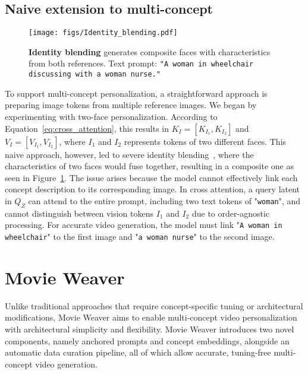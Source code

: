 \subsection{Naive extension to multi-concept}


\begin{figure}[t]
    \begin{center}
    \texttt{[image: figs/Identity\_blending.pdf]}
    \end{center}
    \vspace{-2em}
        \caption{\textbf{Identity blending} generates composite faces with characteristics from both references. Text prompt: \texttt{"A woman in wheelchair discussing with a woman nurse."}}
        \vspace{-1em}
    \label{fig:identity_blending}
\end{figure}


To support multi-concept personalization, a straightforward approach is preparing image tokens from multiple reference images. 
We began by experimenting with two-face personalization. 
According to Equation~\ref{eq:cross_attention}, this results in $ K_I = \left[ K_{I_1}, K_{I_2} \right]$ and $ V_I = \left[ V_{I_1}, V_{I_2} \right]$, where $I_1$ and $I_2$ represents tokens of two different faces.
This naive approach, however, led to severe identity blending~\cite{kumari2023multi,xiao2024fastcomposer}, where the characteristics of two faces would fuse together, resulting in a composite one as seen in Figure~\ref{fig:identity_blending}. 
The issue arises because the model cannot effectively link each concept description to its corresponding image. 
In cross attention, a query latent in $Q_Z$ can attend to the entire prompt, including two text tokens of "\texttt{woman}", and cannot distinguish between vision tokens $I_1$ and $I_2$ due to order-agnostic processing. 
For accurate video generation, the model must link "\texttt{A woman in wheelchair}" to the first image and "\texttt{a woman nurse}" to the second image.


\section{Movie Weaver}
\label{sec:method}

Unlike traditional approaches that require concept-specific tuning or architectural modifications, Movie Weaver aims to enable multi-concept video personalization with architectural simplicity and flexibility. 
Movie Weaver introduces two novel components, namely anchored prompts and concept embeddings, alongside an automatic data curation pipeline, all of which allow accurate, tuning-free multi-concept video generation.


